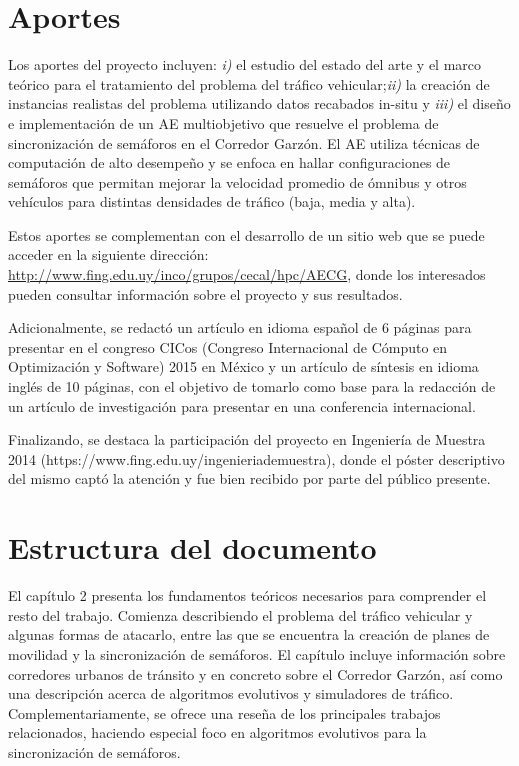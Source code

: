 \section{Aportes}
Los aportes del proyecto incluyen: \textit{i)} el estudio del estado del arte y el marco teórico para el tratamiento del problema del tráfico vehicular;\textit{ii)} la creación de instancias realistas del problema utilizando datos recabados in-situ y \textit{iii)} el diseño e implementación de un AE multiobjetivo que resuelve el problema de sincronización de semáforos en el Corredor Garzón. El AE utiliza técnicas de computación de alto desempeño y se enfoca en hallar configuraciones de semáforos que permitan mejorar la velocidad promedio de ómnibus y otros vehículos para distintas densidades de tráfico (baja, media y alta). 

Estos aportes se complementan con el desarrollo de un sitio web que se puede acceder en la siguiente dirección: \url{http://www.fing.edu.uy/inco/grupos/cecal/hpc/AECG}, donde los interesados pueden consultar información sobre el proyecto y sus resultados. 

Adicionalmente, se redactó un artículo en idioma español de 6 páginas para presentar en el congreso CICos (Congreso Internacional de Cómputo en Optimización y Software) 2015 en México y un artículo de síntesis en idioma inglés de 10 páginas, con el objetivo de tomarlo como base para la redacción de un artículo de investigación para presentar en una conferencia internacional. 

Finalizando, se destaca la participación del proyecto en Ingeniería de Muestra 2014 (https://www.fing.edu.uy/ingenieriademuestra), donde el póster descriptivo del mismo captó la atención y fue bien recibido por parte del público presente.



\section{Estructura del documento}
El capítulo 2 presenta los fundamentos teóricos necesarios para comprender el resto del trabajo. Comienza describiendo el problema del tráfico vehicular y algunas formas de atacarlo, entre las que se encuentra la creación de planes de movilidad y la sincronización de semáforos. El capítulo incluye información sobre corredores urbanos de tránsito y en concreto sobre el Corredor Garzón, así como una descripción acerca de algoritmos evolutivos y simuladores de tráfico. Complementariamente, se ofrece una reseña de los principales trabajos relacionados, haciendo especial foco en algoritmos evolutivos para la sincronización de semáforos.

